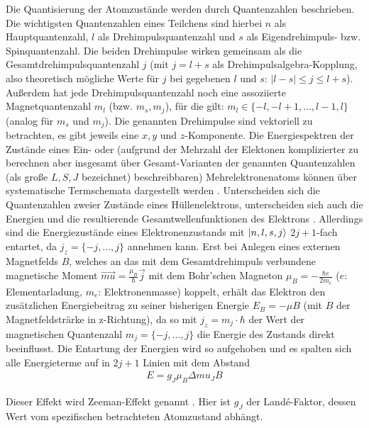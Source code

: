 Die Quantisierung der Atomzustände werden durch Quantenzahlen beschrieben. Die wichtigsten Quantenzahlen eines Teilchens sind hierbei $n$ als Hauptquantenzahl, $l$ als Drehimpulsquantenzahl und $s$ als Eigendrehimpuls- bzw. Spinquantenzahl. Die beiden Drehimpulse wirken gemeinsam als die Gesamtdrehimpulsquantenzahl $j$ (mit $j=l+s$ als Drehimpulsalgebra-Kopplung, also theoretisch mögliche Werte für $j$ bei gegebenen $l$ und $s$: $|l-s|\leq j \leq l+s$). Außerdem hat jede Drehimpulsquantenzahl noch eine assoziierte Magnetquantenzahl $m_l$ (bzw. $m_s, m_j$), für die gilt: $m_l \in \{-l,-l+1,...,l-1,l\}$ (analog für $m_s$ und $m_j$). Die genannten Drehimpulse sind vektoriell zu betrachten, es gibt jeweils eine $x,y$ und $z$-Komponente.
Die Energiespektren der Zustände eines Ein- oder (aufgrund der Mehrzahl der Elektonen komplizierter zu berechnen aber insgesamt über Gesamt-Varianten der genannten Quantenzahlen (als große $L,S,J$ bezeichnet) beschreibbaren) Mehrelektronenatoms können über systematische Termschemata dargestellt werden \cite[1]{Versuchsanleitung401}.
Unterscheiden sich die Quantenzahlen zweier Zustände eines Hüllenelektrons, unterscheiden sich auch die Energien und die resultierende Gesamtwellenfunktionen des Elektrons \cite[729-732]{gerthsen}.
Allerdings sind die Energiezustände eines Elektronenzustands mit $\ket{n,l,s,j}$ $2j+1$-fach entartet, da $j_z=\{-j,...,j\}$ annehmen kann. Erst bei Anlegen eines externen Magnetfelds $B$, welches an das mit dem Gesamtdrehimpuls verbundene magnetische Moment $\vec{mu}=\frac{\mu_B}{\hbar}\vec{j}$ mit dem Bohr'schen Magneton $\mu_B=-\frac{\hbar e}{2 m_e}$ ($e$: Elementarladung, $m_e$: Elektronenmasse) koppelt, erhält das Elektron den zusätzlichen Energiebeitrag zu seiner bisherigen Energie $E_B=-\mu B$ (mit $B$ der Magnetfeldsträrke in z-Richtung), da so mit $j_z=m_j\cdot \hbar$ der Wert der magnetischen Quantenzahl $m_j=\{-j,...,j\}$ die Energie des Zustands direkt beeinflusst. Die Entartung der Energien wird so aufgehoben und es spalten sich alle Energieterme auf in $2j+1$ Linien mit dem Abstand
\begin{align} \label{eq:energiezeeman}
	E=g_J\mu_B \Delta mu_J B
\end{align}

Dieser Effekt wird Zeeman-Effekt genannt \cite{LDzeeman}. Hier ist $g_J$ der Landé-Faktor, dessen Wert vom spezifischen betrachteten Atomzustand abhängt.

